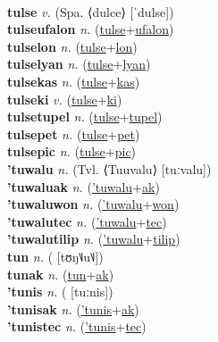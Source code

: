  \label{tulum} \\
\textbf{tulse} \textit{v.} (Spa. ⟨dulce⟩ [ˈdulse])
 \label{tulse} \\
\textbf{tulseufalon} \textit{n.} (\hyperref[tulse]{tulse}+\hyperref[ufalon]{ufalon})
 \label{tulseufalon} \\
\textbf{tulselon} \textit{n.} (\hyperref[tulse]{tulse}+\hyperref[lon]{lon})
 \label{tulselon} \\
\textbf{tulselyan} \textit{n.} (\hyperref[tulse]{tulse}+\hyperref[lyan]{lyan})
 \label{tulselyan} \\
\textbf{tulsekas} \textit{n.} (\hyperref[tulse]{tulse}+\hyperref[kas]{kas})
 \label{tulsekas} \\
\textbf{tulseki} \textit{v.} (\hyperref[tulse]{tulse}+\hyperref[ki]{ki})
 \label{tulseki} \\
\textbf{tulsetupel} \textit{n.} (\hyperref[tulse]{tulse}+\hyperref[tupel]{tupel})
 \label{tulsetupel} \\
\textbf{tulsepet} \textit{n.} (\hyperref[tulse]{tulse}+\hyperref[pet]{pet})
 \label{tulsepet} \\
\textbf{tulsepic} \textit{n.} (\hyperref[tulse]{tulse}+\hyperref[pic]{pic})
 \label{tulsepic} \\
\textbf{'tuwalu} \textit{n.} (Tvl. ⟨Tuuvalu⟩ [tuːvalu])
 \label{'tuwalu} \\
\textbf{'tuwaluak} \textit{n.} (\hyperref['tuwalu]{'tuwalu}+\hyperref[ak]{ak})
 \label{'tuwaluak} \\
\textbf{'tuwaluwon} \textit{n.} (\hyperref['tuwalu]{'tuwalu}+\hyperref[won]{won})
 \label{'tuwaluwon} \\
\textbf{'tuwalutec} \textit{n.} (\hyperref['tuwalu]{'tuwalu}+\hyperref[tec]{tec})
 \label{'tuwalutec} \\
\textbf{'tuwalutilip} \textit{n.} (\hyperref['tuwalu]{'tuwalu}+\hyperref[tilip]{tilip})
 \label{'tuwalutilip} \\
\textbf{tun} \textit{n.} ( [tʊŋ˥˩u˥˩])
 \label{tun} \\
\textbf{tunak} \textit{n.} (\hyperref[tun]{tun}+\hyperref[ak]{ak})
 \label{tunak} \\
\textbf{'tunis} \textit{n.} ( [tuːnis])
 \label{'tunis} \\
\textbf{'tunisak} \textit{n.} (\hyperref['tunis]{'tunis}+\hyperref[ak]{ak})
 \label{'tunisak} \\
\textbf{'tunistec} \textit{n.} (\hyperref['tunis]{'tunis}+\hyperref[tec]{tec})
 \label{'tunistec} \\
